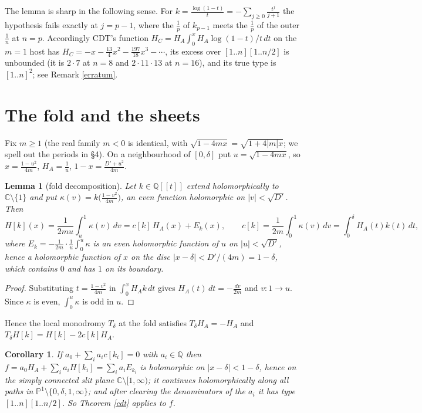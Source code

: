 \documentclass[11pt]{amsart}
\newtheorem{lemma}[theorem]{Lemma}
\newtheorem{corollary}[theorem]{Corollary}
\theoremstyle{remark}
\newcommand{\Q}{\mathbb Q}\newcommand{\Z}{\mathbb Z}\newcommand{\R}{\mathbb R}\newcommand{\C}{\mathbb C}
\newcommand{\PP}{\mathbb P}\newcommand{\D}{\mathbb D}\newcommand{\T}{\mathbb T}\newcommand{\Cl}{\mathrm{Cl}_2}\newcommand{\Li}{\mathrm{Li}_2}
\newcommand{\lcm}[1]{[1..#1]}
\begin{document}
The lemma is sharp in the following sense. For $k=\frac{\log(1-t)}t=-\sum_{j\ge0}\frac{t^j}{j+1}$ the hypothesis fails exactly at $j=p-1$, where the $\frac1p$ of $k_{p-1}$ meets the $\frac1p$ of the outer $\frac1n$ at $n=p$. Accordingly CDT's function $H_C=H_A\int_0^xH_A\log(1-t)/t\,dt$ on the $m=1$ host has $H_C=-x-\frac{13}4x^2-\frac{197}{18}x^3-\cdots$, its excess over $\lcm n\lcm{n/2}$ is unbounded (it is $2\cdot7$ at $n=8$ and $2\cdot11\cdot13$ at $n=16$), and its true type is $\lcm n^2$; see Remark \ref{erratum}.

\section{The fold and the sheets}
Fix $m\ge1$ (the real family $m<0$ is identical, with $\sqrt{1-4mx}=\sqrt{1+4|m|x}$; we spell out the periods in \S4). On a neighbourhood of $[0,\delta]$ put $u=\sqrt{1-4mx}$, so $x=\frac{1-u^2}{4m}$, $H_A=\frac1u$, $1-x=\frac{D'+u^2}{4m}$.

\begin{lemma}[fold decomposition]\label{fold}
Let $k\in\Q[[t]]$ extend holomorphically to $\C\setminus\{1\}$ and put $\kappa(v)=k\bigl(\frac{1-v^2}{4m}\bigr)$, an even function holomorphic on $|v|<\sqrt{D'}$. Then
\[
H[k](x)=\frac1{2mu}\int_u^1\kappa(v)\,dv=c[k]\,H_A(x)+E_k(x),\qquad c[k]=\frac1{2m}\int_0^1\kappa(v)\,dv=\int_0^\delta H_A(t)k(t)\,dt,
\]
where $E_k=-\frac1{2m}\cdot\frac1u\int_0^u\kappa$ is an even holomorphic function of $u$ on $|u|<\sqrt{D'}$, hence a holomorphic function of $x$ on the disc $|x-\delta|<D'/(4m)=1-\delta$, which contains $0$ and has $1$ on its boundary.
\end{lemma}

\begin{proof}
Substituting $t=\frac{1-v^2}{4m}$ in $\int_0^xH_Ak\,dt$ gives $H_A(t)\,dt=-\frac{dv}{2m}$ and $v\colon1\to u$. Since $\kappa$ is even, $\int_0^u\kappa$ is odd in $u$.
\end{proof}

Hence the local monodromy $T_\delta$ at the fold satisfies $T_\delta H_A=-H_A$ and $T_\delta H[k]=H[k]-2c[k]H_A$.

\begin{corollary}\label{cond}
If $a_0+\sum_ia_ic[k_i]=0$ with $a_i\in\Q$ then $f=a_0H_A+\sum_ia_iH[k_i]=\sum_ia_iE_{k_i}$ is holomorphic on $|x-\delta|<1-\delta$, hence on the simply connected slit plane $\C\setminus[1,\infty)$; it continues holomorphically along all paths in $\PP^1\setminus\{0,\delta,1,\infty\}$; and after clearing the denominators of the $a_i$ it has type $\lcm n\lcm{n/2}$. So Theorem \ref{cdt} applies to $f$.
\end{corollary}
\end{document}
